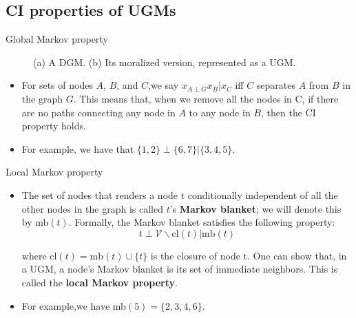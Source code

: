 \documentclass[10pt,mathserif]{beamer}
\begin{document}
\subsection{CI properties of UGMs}
\begin{frame}{Global Markov property}
\begin{figure}[h]
\centering     %
{}
\caption{(a) A DGM. (b) Its moralized version, represented as a UGM.}
\end{figure}

\begin{itemize}
\item For sets of nodes $A$, $B$, and $C$,we say $x_{A\perp G} x_B|x_C$ iff $C$ separates $A$ from $B$ in the graph $G$. This means that, when we remove all the nodes in C, if there are no paths connecting any node in $A$ to any node in $B$, then the CI property holds.
\item For example, we have that $\{1,2\}\perp\{6,7\}|\{3,4,5\}$.
\end{itemize}
\end{frame}

\begin{frame}{Local Markov property}
\begin{itemize}
    \item The set of nodes that renders a node t conditionally independent of all the other nodes in the graph is called $t$'s \textbf{Markov blanket}; we will denote this by mb$(t)$. Formally, the Markov blanket satisfies the following property:
    \begin{equation}
        t\perp\mathcal{V} \backslash  \text{cl}(t) | \text{mb}(t)
    \end{equation}
    
    where $\text{cl}(t) = \text{mb}(t) \cup \{t\}$ is the closure of node t. One can show that, in a UGM, a node's Markov blanket is its set of immediate neighbors. This is called the \textbf{local Markov property}.
    
    \item For example,we have mb$(5)=\{2,3,4,6\}$.
\end{itemize}
\end{frame}
\end{document}
